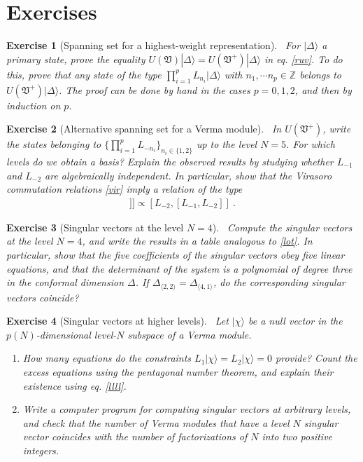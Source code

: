 \documentclass[12pt, a4paper, notitlepage, twoside]{report}
\numberwithin{equation}{section}
\theoremstyle{break}
\newtheorem{exo}{Exercise}[chapter]
\begin{document}
\section{Exercises}

\begin{exo}[Spanning set for a highest-weight representation]
 ~\label{exospan}
For $|\Delta\rangle$ a primary state, prove the equality $U(\mathfrak{V})|\Delta\rangle =U(\mathfrak{V}^+)|\Delta\rangle$ in eq. \eqref{ruv}.
To do this, prove that any state of the type $\prod_{i=1}^p L_{n_i}|\Delta\rangle$ with $n_1,\cdots n_p\in {\mathbb{Z}}$ belongs to $U(\mathfrak{V}^+)|\Delta\rangle$.
The proof can be done by hand in the cases $p=0,1,2$, and then by induction on $p$.
\end{exo}

\begin{exo}[Alternative spanning set for a Verma module]
 ~\label{exoot}
In $U(\mathfrak{V}^+)$, write the states belonging to  $\{\prod_{i=1}^p L_{-n_i}\}_{n_i\in\{1,2\}}$ up to the level $N=5$.
For which levels do we obtain a basis? Explain the observed results by studying whether $L_{-1}$ and $L_{-2}$ are algebraically independent.
In particular, show that the Virasoro commutation relations \eqref{vir} imply a relation of the type
\begin{align}
 [L_{-1},[L_{-1},[L_{-1},L_{-2}]]] \propto [L_{-2},[L_{-1},L_{-2}]]\ .
 \label{llll}
\end{align}
\end{exo}

\begin{exo}[Singular vectors at the level $N=4$]
~\label{exolf}
 Compute the singular vectors at the level $N=4$, and write the results in a table analogous to \eqref{lot}.
In particular, show that the five coefficients of the singular vectors obey five linear equations, and that the determinant of the system is a polynomial of degree three in the conformal dimension $\Delta$. 
If $\Delta_{\langle 2,2 \rangle} = \Delta_{\langle 4, 1\rangle}$, do the corresponding singular vectors coincide?
\end{exo}

\begin{exo}[Singular vectors at higher levels]
~\label{exohl}
Let $|\chi\rangle$ be
a null vector in the $p(N)$-dimensional level-$N$ subspace of a Verma module.
\begin{enumerate}
 \item How many equations do the constraints $L_1|\chi\rangle = L_2|\chi\rangle = 0$ provide? Count the excess equations using the pentagonal number theorem, and explain their existence using eq. \eqref{llll}.
 \item
 Write a computer program for computing singular vectors at arbitrary levels, and check that the number of Verma modules that have a level $N$ singular vector coincides with the number of factorizations of $N$ into two positive integers.
\end{enumerate}
\end{exo}
\end{document}
